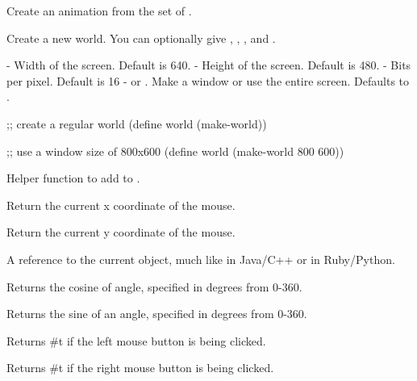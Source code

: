 Create an animation from the set of .


Create a new world. You can optionally give , , , and .

 - Width of the screen. Default is 640.\newline
{} - Height of the screen. Default is 480.\newline
{} - Bits per pixel. Default is 16\newline
{} -  or . Make a window or use the entire screen. Defaults to .

\begin{schemedisplay}
;; create a regular world
(define world (make-world))

;; use a window size of 800x600
(define world (make-world 800 600))
\end{schemedisplay}


Helper function to add  to .


Return the current x coordinate of the mouse.


Return the current y coordinate of the mouse.


A reference to the current object, much like  in Java/C++ or  in Ruby/Python.


Returns the cosine of angle, specified in degrees from 0-360.


Returns the sine of an angle, specified in degrees from 0-360.


Returns #t if the left mouse button is being clicked.


Returns #t if the right mouse button is being clicked.

